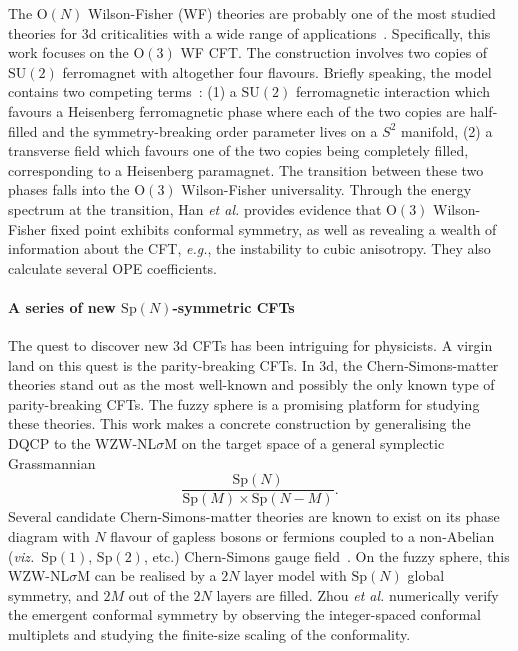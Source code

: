 \documentclass{timesjhep}
\begin{document}
The $\mathrm{O}(N)$ Wilson-Fisher (WF) theories are probably one of the most studied theories for 3d criticalities with a wide range of applications~\cite{Wilson1971WF,Sachdev2011Quantum,Cardy1996Scaling}. Specifically, this work focuses on the $\mathrm{O}(3)$ WF CFT. The construction involves two copies of $\mathrm{SU}(2)$ ferromagnet with altogether four flavours. Briefly speaking, the model contains two competing terms~: (1) a $\mathrm{SU}(2)$ ferromagnetic interaction which favours a Heisenberg ferromagnetic phase where each of the two copies are half-filled and the symmetry-breaking order parameter lives on a $S^2$ manifold, (2) a transverse field which favours one of the two copies being completely filled, corresponding to a Heisenberg paramagnet. The transition between these two phases falls into the $\mathrm{O}(3)$ Wilson-Fisher universality. Through the energy spectrum at the transition, Han \textit{et al.} provides evidence that $\mathrm{O}(3)$ Wilson-Fisher fixed point exhibits conformal symmetry, as well as revealing a wealth of information about the CFT, \textit{e.g.}, the instability to cubic anisotropy. They also calculate several OPE coefficients. 

\paragraph{A series of new $\mathrm{Sp}(N)$-symmetric CFTs~\cite{Zhou2024Oct}}

The quest to discover new 3d CFTs has been intriguing for physicists. A virgin land on this quest is the parity-breaking CFTs. In 3d, the Chern-Simons-matter theories stand out as the most well-known and possibly the only known type of parity-breaking CFTs. The fuzzy sphere is a promising platform for studying these theories. This work makes a concrete construction by generalising the DQCP to the WZW-NL$\sigma$M on the target space of a general symplectic Grassmannian 
\begin{equation}
    \frac{\mathrm{Sp}(N)}{\mathrm{Sp}(M)\times\mathrm{Sp}(N-M)}.
\end{equation}
Several candidate Chern-Simons-matter theories are known to exist on its phase diagram with $N$ flavour of gapless bosons or fermions coupled to a non-Abelian (\textit{viz.}~$\mathrm{Sp}(1)$, $\mathrm{Sp}(2)$, etc.) Chern-Simons gauge field~\cite{Komargodski2017QCD}. On the fuzzy sphere, this WZW-NL$\sigma$M can be realised by a $2N$ layer model with $\mathrm{Sp}(N)$ global symmetry, and $2M$ out of the $2N$ layers are filled. Zhou \textit{et al.} numerically verify the emergent conformal symmetry by observing the integer-spaced conformal multiplets and studying the finite-size scaling of the conformality. 
\end{document}
